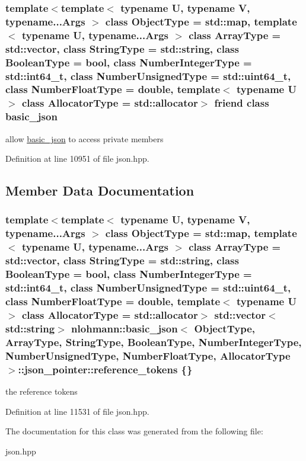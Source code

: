 \subsubsection[{basic\+\_\+json}]{\setlength{\rightskip}{0pt plus 5cm}template$<$template$<$ typename U, typename V, typename...\+Args $>$ class Object\+Type = std\+::map, template$<$ typename U, typename...\+Args $>$ class Array\+Type = std\+::vector, class String\+Type  = std\+::string, class Boolean\+Type  = bool, class Number\+Integer\+Type  = std\+::int64\+\_\+t, class Number\+Unsigned\+Type  = std\+::uint64\+\_\+t, class Number\+Float\+Type  = double, template$<$ typename U $>$ class Allocator\+Type = std\+::allocator$>$ friend class {\bf basic\+\_\+json}\hspace{0.3cm}{\ttfamily [friend]}}\label{classnlohmann_1_1basic__json_1_1json__pointer_ada3100cdb8700566051828f1355fa745}


allow \hyperlink{classnlohmann_1_1basic__json}{basic\+\_\+json} to access private members 



Definition at line 10951 of file json.\+hpp.



\subsection{Member Data Documentation}
\hypertarget{classnlohmann_1_1basic__json_1_1json__pointer_a9c89f0314ddb85e5f40b1189bc3f1616}{}
\subsubsection[{reference\+\_\+tokens}]{\setlength{\rightskip}{0pt plus 5cm}template$<$template$<$ typename U, typename V, typename...\+Args $>$ class Object\+Type = std\+::map, template$<$ typename U, typename...\+Args $>$ class Array\+Type = std\+::vector, class String\+Type  = std\+::string, class Boolean\+Type  = bool, class Number\+Integer\+Type  = std\+::int64\+\_\+t, class Number\+Unsigned\+Type  = std\+::uint64\+\_\+t, class Number\+Float\+Type  = double, template$<$ typename U $>$ class Allocator\+Type = std\+::allocator$>$ std\+::vector$<$std\+::string$>$ {\bf nlohmann\+::basic\+\_\+json}$<$ Object\+Type, Array\+Type, String\+Type, Boolean\+Type, Number\+Integer\+Type, Number\+Unsigned\+Type, Number\+Float\+Type, Allocator\+Type $>$\+::json\+\_\+pointer\+::reference\+\_\+tokens \{\}\hspace{0.3cm}{\ttfamily [private]}}\label{classnlohmann_1_1basic__json_1_1json__pointer_a9c89f0314ddb85e5f40b1189bc3f1616}


the reference tokens 



Definition at line 11531 of file json.\+hpp.



The documentation for this class was generated from the following file\+:\begin{DoxyCompactItemize}
\item 
json.\+hpp\end{DoxyCompactItemize}
